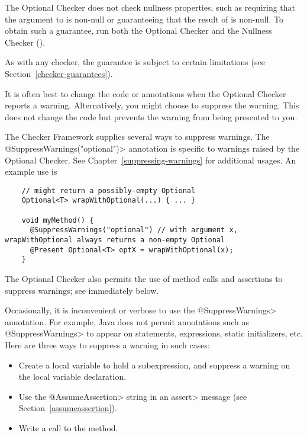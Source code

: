 The Optional Checker does not check nullness properties, such as requiring
that the argument to
is non-null or guaranteeing that the result of
is non-null.  To obtain such a guarantee, run both the Optional Checker and
the Nullness Checker ().

As with any checker, the guarantee is subject to certain limitations (see
Section~\ref{checker-guarantees}).


It is often best to change the code or annotations when the Optional Checker
reports a warning.
Alternatively, you might choose to suppress the warning.
This does not change the code but prevents the warning from being presented to
you.

\begin{sloppypar}
The Checker Framework supplies several ways to suppress warnings.
The \<@SuppressWarnings("optional")> annotation is specific to warnings raised
by the Optional Checker.
See Chapter~\ref{suppressing-warnings} for additional usages.
An example use is
\end{sloppypar}

\begin{smaller}
\begin{Verbatim}
    // might return a possibly-empty Optional
    Optional<T> wrapWithOptional(...) { ... }

    void myMethod() {
      @SuppressWarnings("optional") // with argument x, wrapWithOptional always returns a non-empty Optional
      @Present Optional<T> optX = wrapWithOptional(x);
    }
\end{Verbatim}
\end{smaller}

The Optional Checker also permits the use of method calls and assertions to
suppress warnings; see immediately below.



Occasionally, it is inconvenient or
verbose to use the \<@SuppressWarnings> annotation.  For example, Java does
not permit annotations such as \<@SuppressWarnings> to appear on
statements, expressions, static initializers, etc.
Here are three ways to suppress a warning in such cases:
\begin{itemize}
\item
  Create a local variable to hold a subexpression, and
  suppress a warning on the local variable declaration.
\item
  Use the \<@AssumeAssertion> string in
  an \<assert> message (see Section~\ref{assumeassertion}).
\item
  Write a call to the
   method.
\end{itemize}

